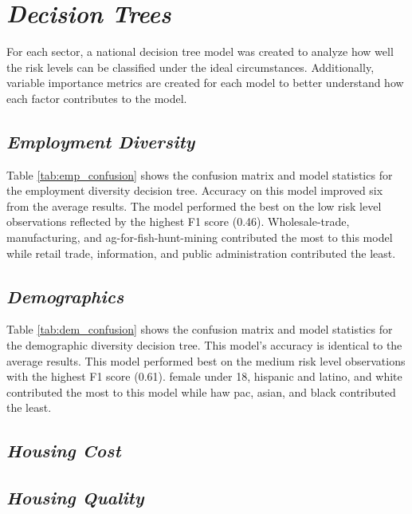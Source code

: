 \section{\textit{Decision Trees}}
For each sector, a national decision tree model was created to analyze how well the risk levels can be classified under the ideal circumstances. Additionally, variable importance metrics are created for each model to better understand how each factor contributes to the model.


\subsection{\textit{Employment Diversity}}
Table \ref{tab:emp_confusion} shows the confusion matrix and model statistics for the employment diversity decision tree. Accuracy on this model improved six \pct from the average \mlr results. The model performed the best on the low risk level observations reflected by the highest F1 score (0.46). Wholesale-trade, manufacturing, and ag-for-fish-hunt-mining contributed the most to this model while retail trade, information, and public administration contributed the least. 



\pagebreak

\subsection{\textit{Demographics}}

Table \ref{tab:dem_confusion} shows the confusion matrix and model statistics for the demographic diversity decision tree. This model's accuracy is identical to the average \mlr results. This model performed best on the medium risk level observations with the highest F1 score (0.61). female under 18, hispanic and latino, and white contributed the most to this model while haw pac, asian, and black contributed the least. 



\pagebreak

\subsection{\textit{Housing Cost}}



\subsection{\textit{Housing Quality}}

